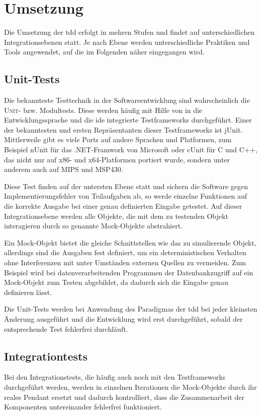 \documentclass{mitschrift}
\newcommand{\pje}{\marginpar{Philipp\\Jeske}}
\begin{document}
\chapter{Umsetzung}
\pje
Die Umsetzung der \gls{tdd} erfolgt in mehren Stufen und findet auf
unterschiedlichen Integrationsebenen statt. Je nach Ebene werden
unterschiedliche Praktiken und Tools angewendet, auf die im Folgenden näher
eingegangen wird.

\section{Unit-Tests}
Die bekannteste Testtechnik in der Softwareentwicklung sind wahrscheinlich die
\textsc{Unit}- bzw. Modultests. Diese werden häufig mit Hilfe von in die
Entwicklungssprache und die \gls{ide} integrierte Testframeworks durchgeführt.
Einer der bekanntesten und ersten Repräsentanten dieser Testframeworks ist
jUnit. Mittlerweile gibt es viele Ports auf andere Sprachen und Platformen, zum
Beispiel nUnit für das .NET-Framwork von Microsoft oder cUnit für C und C++,
das nicht nur auf x86- und x64-Platformen portiert wurde, sondern unter anderem
auch auf MIPS und MSP430.

Diese Test finden auf der untersten Ebene statt und sichern die Software gegen
Implementierungsfehler von Teilaufgaben ab, so werde einzelne Funktionen auf
die korrekte Ausgabe bei einer genau definierten Eingabe getestet. Auf dieser
Integrationsebene werden alle Objekte, die mit dem zu testenden Objekt
interagieren durch so genannte Mock-Objekte abstrahiert.

Ein Mock-Objekt bietet die gleiche Schnittstellen wie das zu simulierende
Objekt, allerdings sind die Ausgaben fest definiert, um ein deterministischen
Verhalten ohne Interferenzen mit unter Umständen externen Quellen zu vermeiden.
Zum Beispiel wird bei datenverarbeitenden Programmen der Datenbankzugriff auf
ein Mock-Objekt zum Testen abgebildet, da dadurch sich die Eingabe genau
definieren lässt.

Die Unit-Tests werden bei Anwendung des Paradigmas der \gls{tdd} bei jeder
kleinsten Änderung ausgeführt und die Entwicklung wird erst durchgeführt,
sobald der entsprechende Test fehlerfrei durchläuft.

\section{Integrationtests}
Bei den Integrationstests, die häufig auch noch mit den Testframeworks
durchgeführt werden, werden in einzelnen Iterationen die Mock-Objekte durch ihr
reales Pendant ersetzt und dadurch kontrolliert, dass die Zusammenarbeit der
Komponenten untereinander fehlerfrei funktioniert.
\end{document}
